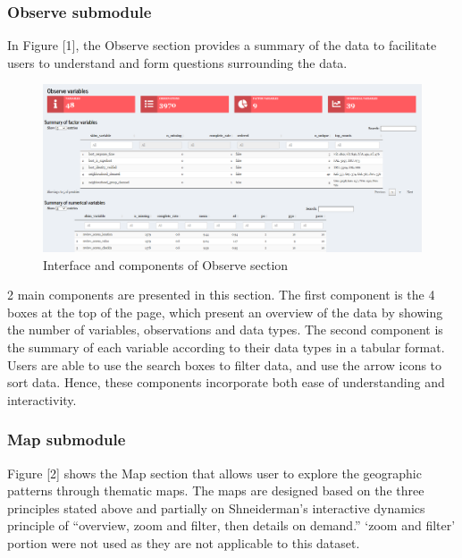 \documentclass{acm_proc_article-sp}
\begin{document}
\hypertarget{observe-submodule}{%
\subsubsection{Observe submodule}\label{observe-submodule}}

In Figure {[}1{]}, the Observe section provides a summary of the data to
facilitate users to understand and form questions surrounding the data.

\begin{figure}[H]

{\centering \includegraphics[width=1\linewidth]{images/design_observe} 

}

\caption{Interface and components of Observe section}\label{fig:unnamed-chunk-1}
\end{figure}

2 main components are presented in this section. The first component is
the 4 boxes at the top of the page, which present an overview of the
data by showing the number of variables, observations and data types.
The second component is the summary of each variable according to their
data types in a tabular format. Users are able to use the search boxes
to filter data, and use the arrow icons to sort data. Hence, these
components incorporate both ease of understanding and interactivity.

\hypertarget{map-submodule}{%
\subsubsection{Map submodule}\label{map-submodule}}

Figure {[}2{]} shows the Map section that allows user to explore the
geographic patterns through thematic maps. The maps are designed based
on the three principles stated above and partially on Shneiderman's
interactive dynamics principle of ``overview, zoom and filter, then
details on demand.'' `zoom and filter' portion were not used as they are
not applicable to this dataset.
\end{document}
